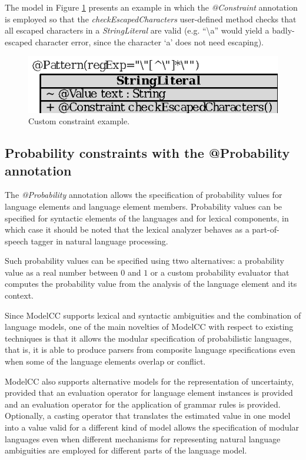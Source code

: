 \documentclass[a4paper,twoside,onecolumn]{article}
\newcommand{\an}[1]{\emph{#1}} %
\begin{document}
The model in Figure \ref{fig:stringliteral2} presents an example in which the \an{@Constraint} annotation is employed so that the \emph{checkEscapedCharacters} user-defined method checks that all escaped characters in a \emph{StringLiteral} are valid (e.g. ``\textbackslash a'' would yield a badly-escaped character error, since the character `a' does not need escaping).

\begin{figure}[tb!]
\centering
\includegraphics[scale=1]{stringliteral2.eps}
\caption{Custom constraint example.}
\label{fig:stringliteral2}
\end{figure}

\subsection{Probability constraints with the @Probability annotation} \label{subsec:probability}

The \emph{@Probability} annotation allows the specification of probability values for language elements and language element members. Probability values can be specified for syntactic elements of the languages and for lexical components, in which case it should be noted that the lexical analyzer behaves as a part-of-speech tagger in natural language processing.

Such probability values can be specified using ttwo alternatives: a probability value as a real number between $0$ and $1$ or a custom probability evaluator that computes the probability value from the analysis of the language element and its context.

Since ModelCC supports lexical and syntactic ambiguities and the combination of language models, one of the main novelties of ModelCC with respect to existing techniques is that it allows the modular specification of probabilistic languages, that is, it is able to produce parsers from composite language specifications even when some of the language elements overlap or conflict.

ModelCC also supports alternative models for the representation of uncertainty, provided that an evaluation operator for language element instances is provided and an evaluation operator for the application of grammar rules is provided.
Optionally, a casting operator that translates the estimated value in one model into a value valid for a different kind of model allows the specification of modular languages even when different mechanisms for representing natural language ambiguities are employed for different parts of the language model.
\end{document}
